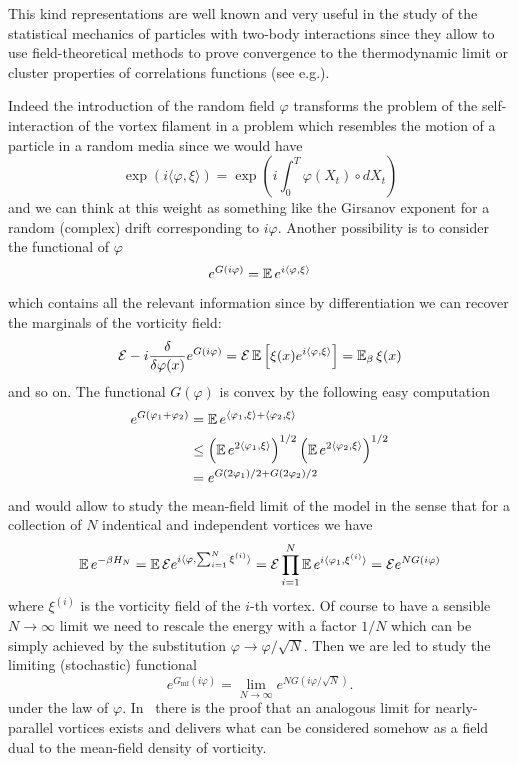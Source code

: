 This kind representations are well known and very useful in the study of the
statistical mechanics of particles with two-body interactions since they
allow to use field-theoretical methods to prove convergence to the
thermodynamic limit or cluster properties of correlations functions
(see e.g.\cite{Simon}).  

Indeed the introduction of the random field $\varphi$ transforms the
problem of the self-interaction of the vortex filament in a problem
which resembles the motion of a particle in a random media since we
would have
$$
\exp\left({i \langle \varphi, \xi \rangle}\right) = 
\exp\left({i \int_0^T \varphi(X_t) \circ dX_t}\right)
$$ 
and we can think at this weight as something like the Girsanov exponent
for a random (complex) drift corresponding to $i\varphi$. Another
possibility is to consider the functional of $\varphi$
$$
e^{G(i \varphi)} = \operatorname{{\mathbb E}} e^{i \langle \varphi, \xi \rangle } 
$$
which contains all the relevant information since by
differentiation we can recover the marginals of the vorticity field:
$$
\mathcal{E} -i \frac{\delta }{\delta \varphi(x)} e^{G(i \varphi)} =
\mathcal{E} \operatorname{{\mathbb E}} \left[ \xi(x) e^{i \langle \varphi, \xi \rangle} \right]
= \operatorname{{\mathbb E}}_\beta  \xi(x) 
$$
and so on.
The functional $G(\varphi)$ is convex by the following easy
computation
\begin{equation*}
\begin{split}
e^{G(\varphi_1+\varphi_2)} & = \operatorname{{\mathbb E}} e^{ \langle \varphi_1, \xi
  \rangle +  \langle \varphi_2, \xi \rangle } \\ & \le 
\left( \operatorname{{\mathbb E}} e^{2  \langle \varphi_1, \xi \rangle}\right)^{1/2} 
\left( \operatorname{{\mathbb E}} e^{2  \langle \varphi_2, \xi \rangle}\right)^{1/2} 
\\ & = e^{G(2\varphi_1)/2+G(2\varphi_2)/2}
\end{split}
\end{equation*}
and would allow to study the mean-field limit of the model in the
sense that for a collection of $N$ indentical and independent vortices
we have
$$
\operatorname{{\mathbb E}} e^{-\beta H_N} = \operatorname{{\mathbb E}} \mathcal{E} e^{i \langle \varphi, \sum_{i=1}^N \xi^{(i)}
  \rangle} = \mathcal{E}  \prod_{i=1}^N \operatorname{{\mathbb E}} e^{i \langle \varphi_1, 
  \xi^{(i)} \rangle} = \mathcal{E} e^{N G(i \varphi)}
$$  
where $\xi^{(i)}$ is the vorticity field of the $i$-th vortex. Of
course to have a sensible $N \to \infty$ limit we need to rescale the
energy with a factor $1/N$ which can be simply achieved by the substitution
$\varphi \to \varphi/\sqrt{N}$. Then we are led to study the limiting
(stochastic) functional
$$
e^{G_{\text{mf}}(i \varphi)} = \lim_{N \to \infty} e^{N G(i \varphi / \sqrt{N})}.
$$
under the law of $\varphi$.
In~\cite{PLL - M} there is the proof that an analogous limit for
nearly-parallel vortices exists and delivers what can
be considered somehow as a field dual to the mean-field density of vorticity.     

